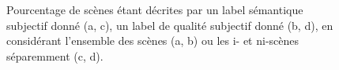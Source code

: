 \begin{figure}[t]
        \myfloatalign
         \par
       \caption{Pourcentage de scènes étant décrites par un label sémantique subjectif donné (a, c), un label de qualité subjectif donné (b, d), en considérant l'ensemble des scènes (a, b) ou les i- et ni-scènes séparemment (c, d).}\label{fig:countLabel}
\end{figure}


